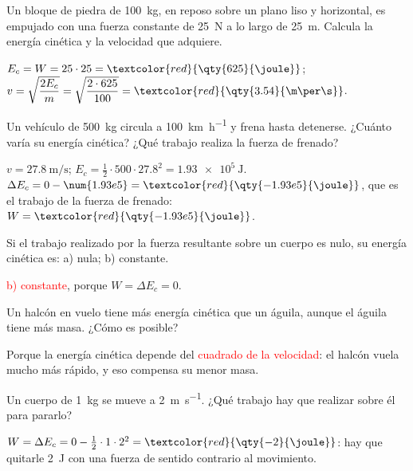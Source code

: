 \begin{exercise}
    Un bloque de piedra de \qty{100}{\kg}, en reposo sobre un plano liso y horizontal, es empujado con una fuerza constante de \qty{25}{\newton} a lo largo de \qty{25}{\m}. Calcula la energía cinética y la velocidad que adquiere.
    \begin{solu}
        \(E_c = W = 25 \cdot 25 = \textcolor{red}{\qty{625}{\joule}}\); \(v = \sqrt{\dfrac{2 E_c}{m}} = \sqrt{\dfrac{2 \cdot 625}{100}} = \textcolor{red}{\qty{3.54}{\m\per\s}}\).
    \end{solu}
\end{exercise}

\begin{exercise}
    Un vehículo de \qty{500}{\kg} circula a \qty{100}{\km\per\hour} y frena hasta detenerse. ¿Cuánto varía su energía cinética? ¿Qué trabajo realiza la fuerza de frenado?
    \begin{solu}
        \(v = \qty{27.8}{\m\per\s}\); \(E_c = \frac{1}{2} \cdot 500 \cdot \num{27.8}^2 = \qty{1.93e5}{\joule}\). \(\Delta E_c = 0 - \num{1.93e5} = \textcolor{red}{\qty{-1.93e5}{\joule}}\), que es el trabajo de la fuerza de frenado: \(W = \textcolor{red}{\qty{-1.93e5}{\joule}}\).
    \end{solu}
\end{exercise}

\begin{exercise}
    Si el trabajo realizado por la fuerza resultante sobre un cuerpo es nulo, su energía cinética es: a) nula; b) constante.
    \begin{solu}
        \textcolor{red}{b) constante}, porque \(W = \Delta E_c = 0\).
    \end{solu}
\end{exercise}

\begin{exercise}
    Un halcón en vuelo tiene más energía cinética que un águila, aunque el águila tiene más masa. ¿Cómo es posible?
    \begin{solu}
        Porque la energía cinética depende del \textcolor{red}{cuadrado de la velocidad}: el halcón vuela mucho más rápido, y eso compensa su menor masa.
    \end{solu}
\end{exercise}

\begin{exercise}
    Un cuerpo de \qty{1}{\kg} se mueve a \qty{2}{\m\per\s}. ¿Qué trabajo hay que realizar sobre él para pararlo?
    \begin{solu}
        \(W = \Delta E_c = 0 - \frac{1}{2} \cdot 1 \cdot 2^2 = \textcolor{red}{\qty{-2}{\joule}}\): hay que quitarle \qty{2}{\joule} con una fuerza de sentido contrario al movimiento.
    \end{solu}
\end{exercise}

